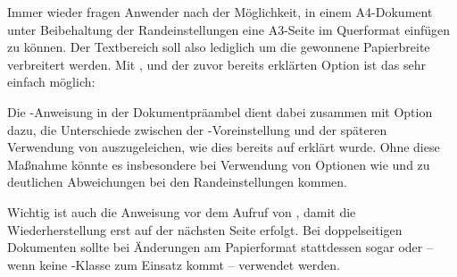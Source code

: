 \begin{Example}
  Immer wieder fragen Anwender nach der Möglichkeit, in einem A4-Dokument
  unter Beibehaltung der Randeinstellungen eine A3-Seite im Querformat
  einfügen zu können. Der Textbereich soll also lediglich um die gewonnene
  Papierbreite verbreitert werden. Mit ,
   und der zuvor bereits erklärten Option
   ist das sehr einfach möglich:
  Die -Anweisung in der
  Dokumentpräambel dient dabei zusammen mit Option
  dazu, die Unterschiede zwischen der
  -Voreinstellung und der späteren Verwendung
  von  auszugeleichen, wie dies bereits auf
   erklärt wurde. Ohne diese
  Maßnahme könnte es insbesondere bei Verwendung von Optionen wie
   und
   zu deutlichen Abweichungen bei den
  Randeinstellungen kommen.
  
  Wichtig ist auch die Anweisung
   vor dem Aufruf von
  , damit die Wiederherstellung erst auf der
  nächsten Seite erfolgt. Bei doppelseitigen Dokumenten sollte bei Änderungen
  am Papierformat stattdessen sogar
   oder
  -- wenn keine \KOMAScript-Klasse zum Einsatz kommt --
   verwendet
  werden.%
\end{Example}

